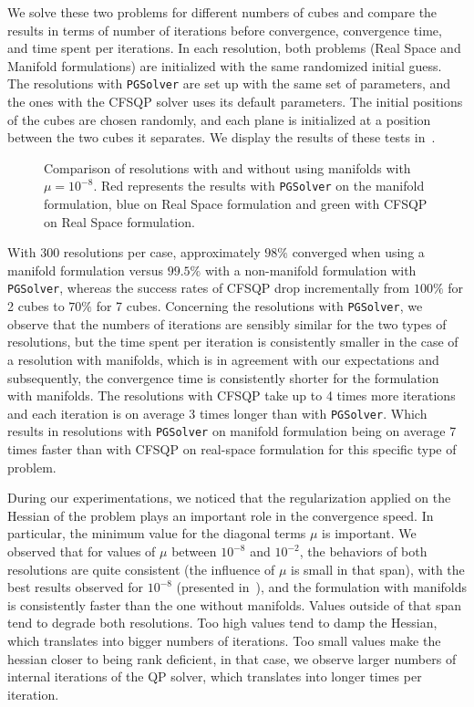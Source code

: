 We solve these two problems for different numbers of cubes and compare the results in terms of number of iterations before convergence, convergence time, and time spent per iterations.
In each resolution, both problems (Real Space and Manifold formulations) are initialized with the same randomized initial guess.
The resolutions with {\tt PGSolver} are set up with the same set of parameters, and the ones with the CFSQP solver uses its default parameters.
The initial positions of the cubes are chosen randomly, and each plane is initialized at a position between the two cubes it separates.
We display the results of these tests in~.
\begin{figure}[htpb]
  \centering
  
  \caption{Comparison of resolutions with and without using manifolds with $\mu=10^{-8}$. Red represents the results with {\tt PGSolver} on the manifold formulation, blue on Real Space formulation and green with CFSQP on Real Space formulation.}
\label{fig:timings-cubes}
\end{figure}

With 300 resolutions per case, approximately $98\%$ converged when using a manifold formulation versus $99.5\%$ with a non-manifold formulation with {\tt PGSolver}, whereas the success rates of CFSQP drop incrementally from $100\%$ for 2 cubes to $70\%$ for 7 cubes.
Concerning the resolutions with {\tt PGSolver}, we observe that the numbers of iterations are sensibly similar for the two types of resolutions, but the time spent per iteration is consistently smaller in the case of a resolution with manifolds, which is in agreement with our expectations and subsequently, the convergence time is consistently shorter for the formulation with manifolds.
The resolutions with CFSQP take up to 4 times more iterations and each iteration is on average 3 times longer than with {\tt PGSolver}.
Which results in resolutions with {\tt PGSolver} on manifold formulation being on average 7 times faster than with CFSQP on real-space formulation for this specific type of problem.

During our experimentations, we noticed that the regularization applied on the Hessian of the problem plays an important role in the convergence speed.
In particular, the minimum value for the diagonal terms $\mu$ is important.
We observed that for values of $\mu$ between $10^{-8}$ and $10^{-2}$, the behaviors of both resolutions are quite consistent (the influence of $\mu$ is small in that span), with the best results observed for $10^{-8}$ (presented in~), and the formulation with manifolds is consistently faster than the one without manifolds.
Values outside of that span tend to degrade both resolutions.
Too high values tend to damp the Hessian, which translates into bigger numbers of iterations.
Too small values make the hessian closer to being rank deficient, in that case, we observe larger numbers of internal iterations of the QP solver, which translates into longer times per iteration.

